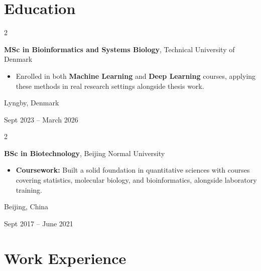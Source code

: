 \documentclass[10pt, letterpaper]{article}
\newenvironment{highlights}{
    \begin{itemize}[
        topsep=0.10 cm,
        parsep=0.10 cm,
        partopsep=0pt,
        itemsep=0pt,
        leftmargin=0.4 cm + 10pt
    ]
}{
    \end{itemize}
}
\newenvironment{twocolentry}[2][]{
    \onecolentry
    \def\secondColumn{#2}
    \setcolumnwidth{\fill, 4.5 cm}
    \begin{paracol}{2}
}{
    \switchcolumn \raggedleft \secondColumn
    \end{paracol}
    \endonecolentry
}
\begin{document}
    \section{Education}

        \begin{twocolentry}{
    Lyngby, Denmark

    Sept 2023 -- March 2026
}
    \textbf{MSc in Bioinformatics and Systems Biology}, Technical University of Denmark
    \begin{highlights}
        \item Enrolled in both \textbf{Machine Learning} and \textbf{Deep Learning} courses, applying these methods in real research settings alongside thesis work.
    \end{highlights}
\end{twocolentry}

        \vspace{0.3 cm}

\begin{twocolentry}{
    Beijing, China

    Sept 2017 -- June 2021
}
    \textbf{BSc in Biotechnology}, Beijing Normal University
    \begin{highlights}
        \item \textbf{Coursework:} Built a solid foundation in quantitative sciences with courses covering statistics, molecular biology, and bioinformatics, alongside laboratory training.
    \end{highlights}
\end{twocolentry}


    \section{Work Experience}
\end{document}
